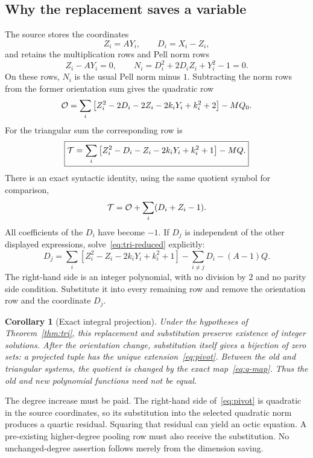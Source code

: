 \documentclass[11pt,letterpaper]{article}
\newtheorem{corollary}[theorem]{Corollary}
\theoremstyle{definition}\newtheorem{definition}[theorem]{Definition}
\theoremstyle{remark}\newtheorem{remark}[theorem]{Remark}
\begin{document}
\subsection{Why the replacement saves a variable}
The source stores the coordinates
\[
Z_i=A Y_i,\qquad D_i=X_i-Z_i,
\]
and retains the multiplication rows and Pell norm rows
\begin{equation}\label{eq:norm}
Z_i-A Y_i=0,\qquad
N_i=D_i^2+2D_iZ_i+Y_i^2-1=0.
\end{equation}
On these rows, $N_i$ is the usual Pell norm minus $1$. Subtracting the norm rows from the former orientation sum gives the quadratic row
\begin{equation}\label{eq:old-reduced}
\mathcal O=\sum_i\left[Z_i^2-2D_i-2Z_i-2k_iY_i+k_i^2+2\right]-M Q_0.
\end{equation}
For the triangular sum the corresponding row is
\begin{equation}\label{eq:tri-reduced}
\boxed{\mathcal T=\sum_i\left[Z_i^2-D_i-Z_i-2k_iY_i+k_i^2+1\right]-M Q.}
\end{equation}
There is an exact syntactic identity, using the same quotient symbol for comparison,
\begin{equation}\label{eq:literal-row-change}
\mathcal T=\mathcal O+\sum_i(D_i+Z_i-1).
\end{equation}
All coefficients of the $D_i$ have become $-1$. If $D_j$ is independent of the other displayed expressions, solve~\eqref{eq:tri-reduced} explicitly:
\begin{equation}\label{eq:pivot}
\boxed{D_j=\sum_i\left[Z_i^2-Z_i-2k_iY_i+k_i^2+1\right]
-\sum_{i\ne j}D_i-(A-1)Q.}
\end{equation}
The right-hand side is an integer polynomial, with no division by $2$ and no parity side condition. Substitute it into every remaining row and remove the orientation row and the coordinate $D_j$.

\begin{corollary}[Exact integral projection]\label{cor:projection}
Under the hypotheses of Theorem~\ref{thm:tri}, this replacement and substitution preserve existence of integer solutions. After the orientation change, substitution itself gives a bijection of zero sets: a projected tuple has the unique extension~\eqref{eq:pivot}. Between the old and triangular systems, the quotient is changed by the exact map~\eqref{eq:q-map}. Thus the old and new polynomial functions need not be equal.
\end{corollary}

The degree increase must be paid. The right-hand side of~\eqref{eq:pivot} is quadratic in the source coordinates, so its substitution into the selected quadratic norm produces a quartic residual. Squaring that residual can yield an octic equation. A pre-existing higher-degree pooling row must also receive the substitution. No unchanged-degree assertion follows merely from the dimension saving.
\end{document}
